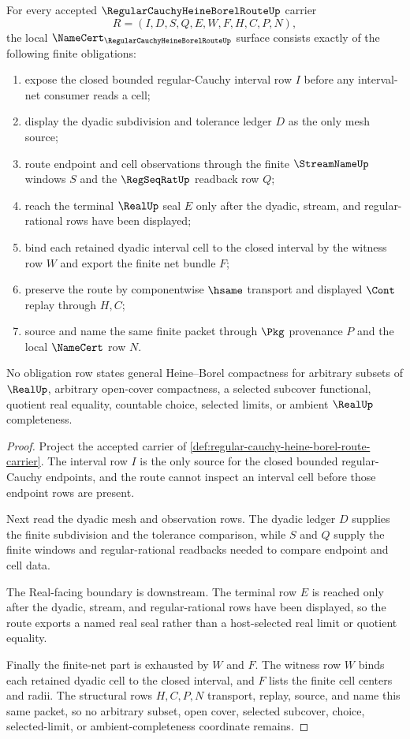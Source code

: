 \begin{theorem}
\label{thm:regular-cauchy-heine-borel-route-obligations}
For every accepted $\RegularCauchyHeineBorelRouteUp$ carrier
$$
R=(I,D,S,Q,E,W,F,H,C,P,N),
$$
the local $\NameCert_{\RegularCauchyHeineBorelRouteUp}$ surface consists exactly of the following finite obligations:
\begin{enumerate}
\item expose the closed bounded regular-Cauchy interval row $I$ before any interval-net consumer reads a cell;
\item display the dyadic subdivision and tolerance ledger $D$ as the only mesh source;
\item route endpoint and cell observations through the finite $\StreamNameUp$ windows $S$ and the $\RegSeqRatUp$ readback row $Q$;
\item reach the terminal $\RealUp$ seal $E$ only after the dyadic, stream, and regular-rational rows have been displayed;
\item bind each retained dyadic interval cell to the closed interval by the witness row $W$ and export the finite net bundle $F$;
\item preserve the route by componentwise $\hsame$ transport and displayed $\Cont$ replay through $H,C$;
\item source and name the same finite packet through $\Pkg$ provenance $P$ and the local $\NameCert$ row $N$.
\end{enumerate}
No obligation row states general Heine--Borel compactness for arbitrary subsets of $\RealUp$, arbitrary open-cover compactness, a selected subcover functional, quotient real equality, countable choice, selected limits, or ambient $\RealUp$ completeness.
\end{theorem}
\begin{proof}
Project the accepted carrier of \autoref{def:regular-cauchy-heine-borel-route-carrier}. The interval row $I$ is the only source for the closed bounded regular-Cauchy endpoints, and the route cannot inspect an interval cell before those endpoint rows are present.

Next read the dyadic mesh and observation rows. The dyadic ledger $D$ supplies the finite subdivision and the tolerance comparison, while $S$ and $Q$ supply the finite windows and regular-rational readbacks needed to compare endpoint and cell data.

The Real-facing boundary is downstream. The terminal row $E$ is reached only after the dyadic, stream, and regular-rational rows have been displayed, so the route exports a named real seal rather than a host-selected real limit or quotient equality.

Finally the finite-net part is exhausted by $W$ and $F$. The witness row $W$ binds each retained dyadic cell to the closed interval, and $F$ lists the finite cell centers and radii. The structural rows $H,C,P,N$ transport, replay, source, and name this same packet, so no arbitrary subset, open cover, selected subcover, choice, selected-limit, or ambient-completeness coordinate remains.
\end{proof}

